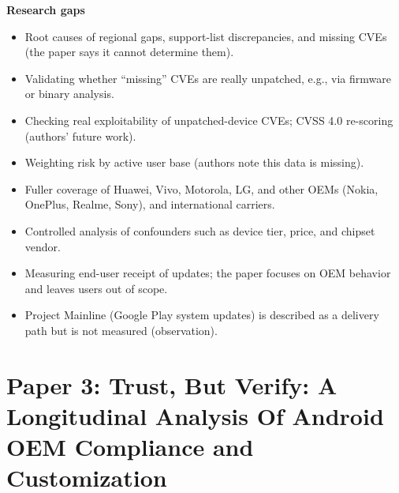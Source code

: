 \documentclass[11pt,a4paper]{article}
\begin{document}
\begin{enumerate}
    \vspace{4pt}
    \textbf{Research gaps}
    \begin{itemize}[leftmargin=*,itemsep=1pt,topsep=2pt]
        \item Root causes of regional gaps, support-list discrepancies, and missing CVEs (the paper says it cannot determine them).
        \item Validating whether ``missing'' CVEs are really unpatched, e.g., via firmware or binary analysis.
        \item Checking real exploitability of unpatched-device CVEs; CVSS 4.0 re-scoring (authors' future work).
        \item Weighting risk by active user base (authors note this data is missing).
        \item Fuller coverage of Huawei, Vivo, Motorola, LG, and other OEMs (Nokia, OnePlus, Realme, Sony), and international carriers.
        \item Controlled analysis of confounders such as device tier, price, and chipset vendor.
        \item Measuring end-user receipt of updates; the paper focuses on OEM behavior and leaves users out of scope.
        \item Project Mainline (Google Play system updates) is described as a delivery path but is not measured (observation).
    \end{itemize}

\end{enumerate}

\newpage

\section{Paper 3: Trust, But Verify: A Longitudinal Analysis Of Android OEM Compliance and Customization}
\end{document}
